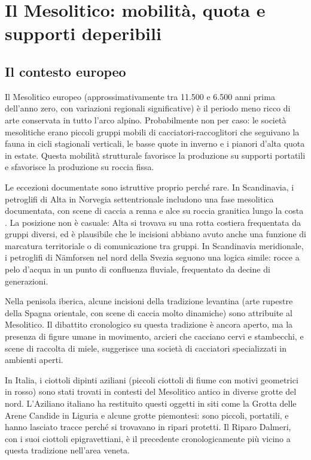 \section{Il Mesolitico: mobilità, quota e supporti deperibili}

\subsection{Il contesto europeo}

Il Mesolitico europeo (approssimativamente tra 11.500 e 6.500 anni prima dell'anno zero, con variazioni regionali significative) è il periodo meno ricco di arte conservata in tutto l'arco alpino. Probabilmente non per caso: le società mesolitiche erano piccoli gruppi mobili di cacciatori-raccoglitori che seguivano la fauna in cicli stagionali verticali, le basse quote in inverno e i pianori d'alta quota in estate. Questa mobilità strutturale favorisce la produzione su supporti portatili e sfavorisce la produzione su roccia fissa.

Le eccezioni documentate sono istruttive proprio perché rare. In Scandinavia, i petroglifi di Alta in Norvegia settentrionale includono una fase mesolitica documentata, con scene di caccia a renna e alce su roccia granitica lungo la costa \citep{helskog1988}. La posizione non è casuale: Alta si trovava su una rotta costiera frequentata da gruppi diversi, ed è plausibile che le incisioni abbiano avuto anche una funzione di marcatura territoriale o di comunicazione tra gruppi. In Scandinavia meridionale, i petroglifi di Nämforsen nel nord della Svezia seguono una logica simile: rocce a pelo d'acqua in un punto di confluenza fluviale, frequentato da decine di generazioni.

Nella penisola iberica, alcune incisioni della tradizione levantina (arte rupestre della Spagna orientale, con scene di caccia molto dinamiche) sono attribuite al Mesolitico. Il dibattito cronologico su questa tradizione è ancora aperto, ma la presenza di figure umane in movimento, arcieri che cacciano cervi e stambecchi, e scene di raccolta di miele, suggerisce una società di cacciatori specializzati in ambienti aperti.

In Italia, i ciottoli dipinti aziliani (piccoli ciottoli di fiume con motivi geometrici in rosso) sono stati trovati in contesti del Mesolitico antico in diverse grotte del nord. L'Aziliano italiano ha restituito questi oggetti in siti come la Grotta delle Arene Candide in Liguria e alcune grotte piemontesi: sono piccoli, portatili, e hanno lasciato tracce perché si trovavano in ripari protetti. Il Riparo Dalmeri, con i suoi ciottoli epigravettiani, è il precedente cronologicamente più vicino a questa tradizione nell'area veneta.

